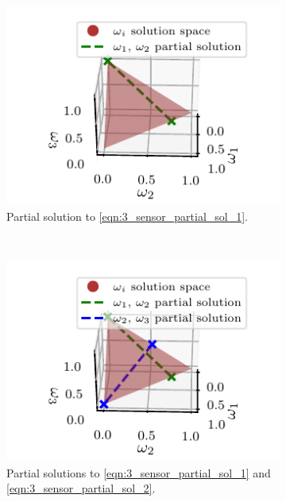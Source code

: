 \documentclass[letterpaper, 10 pt, journal, twoside]{ieeetran}  %
\begin{document}
\begin{figure}[tb]
   \begin{subfigure}[t]{0.3\textwidth}
      \vspace{-5pt}
      \begin{center}
         \includegraphics{images/partial_sol1.pdf}
      \end{center}
      \vspace{-10pt}
      \caption{Partial solution to \eqref{eqn:3_sensor_partial_sol_1}.}
      \label{fig:3_sensor_partial_sol}
   \end{subfigure}
   ~
   \begin{subfigure}[t]{0.3\textwidth}
      \vspace{-5pt}
      \begin{center}
         \includegraphics{images/partial_sols.pdf}
      \end{center}
      \vspace{-10pt}
      \caption{Partial solutions to \eqref{eqn:3_sensor_partial_sol_1} and \eqref{eqn:3_sensor_partial_sol_2}.}
      \label{fig:3_sensor_partial_sols}
   \end{subfigure}
   ~
   \begin{subfigure}[t]{0.3\textwidth}
      \vspace{-5pt}

\end{subfigure}
\end{figure}
\end{document}
